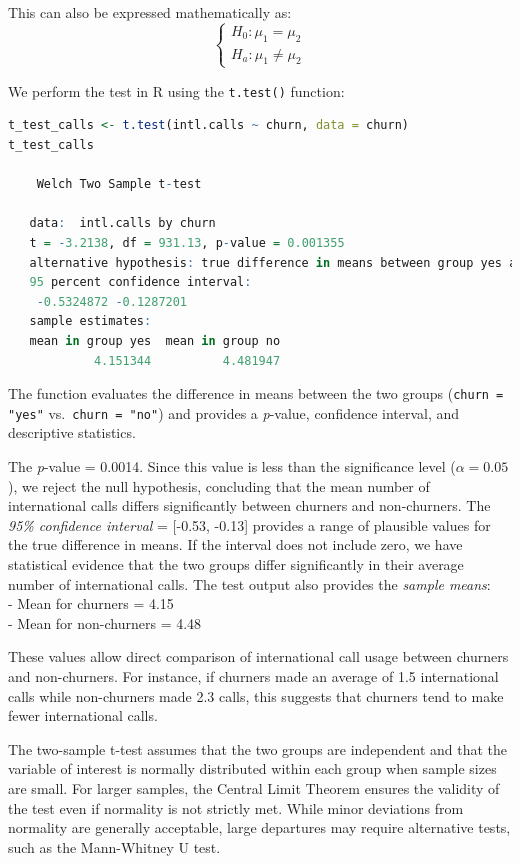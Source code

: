 \documentclass[
  11pt,
]{book}
\newcommand{\passthrough}[1]{#1}
\theoremstyle{definition}
\theoremstyle{definition}
\theoremstyle{definition}
\theoremstyle{definition}
\theoremstyle{remark}
\begin{document}
This can also be expressed mathematically as:
\[
\begin{cases}
    H_0: \mu_1 = \mu_2   \\
    H_a: \mu_1 \neq \mu_2 
\end{cases}
\]

We perform the test in R using the \passthrough{\lstinline!t.test()!} function:

\begin{lstlisting}[language=R]
t_test_calls <- t.test(intl.calls ~ churn, data = churn)
t_test_calls
   
    Welch Two Sample t-test
   
   data:  intl.calls by churn
   t = -3.2138, df = 931.13, p-value = 0.001355
   alternative hypothesis: true difference in means between group yes and group no is not equal to 0
   95 percent confidence interval:
    -0.5324872 -0.1287201
   sample estimates:
   mean in group yes  mean in group no 
            4.151344          4.481947
\end{lstlisting}

The function evaluates the difference in means between the two groups (\passthrough{\lstinline!churn = "yes"!} vs.~\passthrough{\lstinline!churn = "no"!}) and provides a \emph{p}-value, confidence interval, and descriptive statistics.

The \emph{p}-value = 0.0014. Since this value is less than the significance level (\(\alpha = 0.05\)), we reject the null hypothesis, concluding that the mean number of international calls differs significantly between churners and non-churners. The \emph{95\% confidence interval} = {[}-0.53, -0.13{]} provides a range of plausible values for the true difference in means. If the interval does not include zero, we have statistical evidence that the two groups differ significantly in their average number of international calls. The test output also provides the \emph{sample means}:\\
- Mean for churners = 4.15\\
- Mean for non-churners = 4.48

These values allow direct comparison of international call usage between churners and non-churners. For instance, if churners made an average of 1.5 international calls while non-churners made 2.3 calls, this suggests that churners tend to make fewer international calls.

The two-sample t-test assumes that the two groups are independent and that the variable of interest is normally distributed within each group when sample sizes are small. For larger samples, the Central Limit Theorem ensures the validity of the test even if normality is not strictly met. While minor deviations from normality are generally acceptable, large departures may require alternative tests, such as the Mann-Whitney U test.
\end{document}

